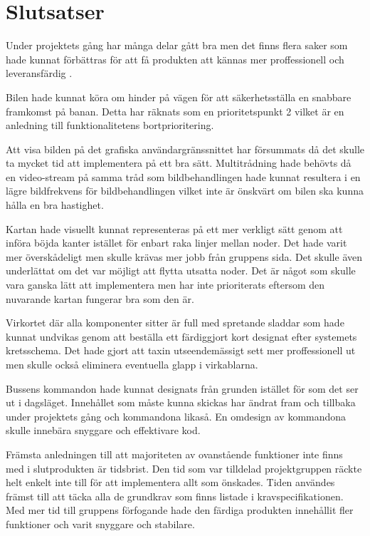 \documentclass[tekniskrapport/tech.tex]{subfiles}
\begin{document}
\section{Slutsatser}
Under projektets gång har många delar gått bra men det finns flera saker som
hade kunnat förbättras för att få produkten att kännas mer proffessionell och
leveransfärdig . 

Bilen hade kunnat köra om hinder på vägen för att
säkerhetsställa en snabbare framkomst på banan. Detta har räknats som en
prioritetspunkt 2 vilket är en anledning till funktionalitetens
bortprioritering.

Att visa bilden på det grafiska användargränssnittet har försummats då det
skulle ta mycket tid att implementera på ett bra sätt. Multitrådning hade
behövts då en video-stream på samma tråd som bildbehandlingen hade kunnat
resultera i en lägre bildfrekvens för bildbehandlingen vilket inte är önskvärt
om bilen ska kunna hålla en bra hastighet.

Kartan hade visuellt kunnat representeras på ett mer verkligt sätt genom att
införa böjda kanter istället för enbart raka linjer mellan noder. Det hade
varit mer överskådeligt men skulle krävas mer jobb från gruppens sida. Det
skulle även underlättat om det var möjligt att flytta utsatta noder. Det är
något som skulle vara ganska lätt att implementera men har inte prioriterats
eftersom den nuvarande kartan fungerar bra som den är.

Virkortet där alla komponenter sitter är full med spretande sladdar som hade
kunnat undvikas genom att beställa ett färdiggjort kort designat efter
systemets kretsschema. Det hade gjort att taxin utseendemässigt sett mer
proffessionell ut men skulle också eliminera eventuella glapp i virkablarna.

Bussens kommandon hade kunnat designats från grunden istället för som det ser
ut i dagsläget. Innehållet som måste kunna skickas har ändrat fram och tillbaka
under projektets gång och kommandona likaså. En omdesign av kommandona skulle
innebära snyggare och effektivare kod.

Främsta anledningen till att majoriteten av ovanstående funktioner inte finns
med i slutprodukten är tidsbrist. Den tid som var tilldelad projektgruppen
räckte helt enkelt inte till för att implementera allt som önskades. Tiden
användes främst till att täcka alla de grundkrav som finns listade i
kravspecifikationen. Med mer tid till gruppens förfogande hade den färdiga
produkten innehållit fler funktioner och varit snyggare och stabilare.
\end{document}
